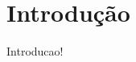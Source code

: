 \documentclass{ufscThesis}
\begin{document}
\folhaderosto[comficha] %
\folhaaprovacao
\paginadedicatoria
\paginaagradecimento
\paginaepigrafe
\paginaresumo
\paginaabstract
\listadefiguras %
\listadetabelas 
\listadeabreviaturas
\listadesimbolos
\sumario

\chapter{Introdução}
Introducao!
\end{document}
